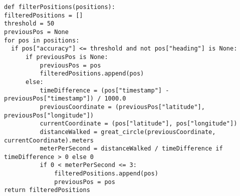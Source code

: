 \begin{verbatim}
def filterPositions(positions):
filteredPositions = []
threshold = 50
previousPos = None
for pos in positions:
  if pos["accuracy"] <= threshold and not pos["heading"] is None:
      if previousPos is None:
          previousPos = pos
          filteredPositions.append(pos)
      else:
          timeDifference = (pos["timestamp"] - previousPos["timestamp"]) / 1000.0
          previousCoordinate = (previousPos["latitude"], previousPos["longitude"])
          currentCoordinate = (pos["latitude"], pos["longitude"])
          distanceWalked = great_circle(previousCoordinate, currentCoordinate).meters
          meterPerSecond = distanceWalked / timeDifference if timeDifference > 0 else 0
          if 0 < meterPerSecond <= 3:
              filteredPositions.append(pos)
              previousPos = pos
return filteredPositions
\end{verbatim}